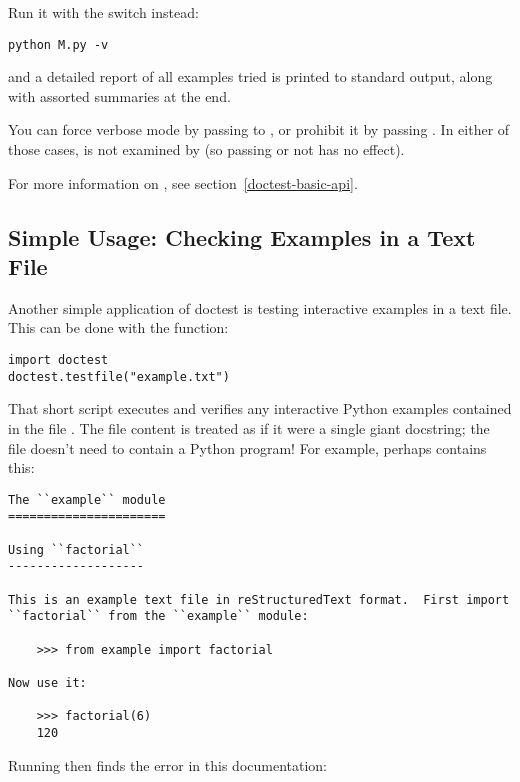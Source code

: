 Run it with the  switch instead:

\begin{verbatim}
python M.py -v
\end{verbatim}

and a detailed report of all examples tried is printed to standard
output, along with assorted summaries at the end.

You can force verbose mode by passing  to
, or
prohibit it by passing .  In either of those cases,
 is not examined by  (so passing
 or not has no effect).

For more information on , see
section~\ref{doctest-basic-api}.

\subsection{Simple Usage: Checking Examples in a Text
            File\label{doctest-simple-testfile}}

Another simple application of doctest is testing interactive examples
in a text file.  This can be done with the 
function:

\begin{verbatim}
import doctest
doctest.testfile("example.txt")
\end{verbatim}

That short script executes and verifies any interactive Python
examples contained in the file .  The file content
is treated as if it were a single giant docstring; the file doesn't
need to contain a Python program!   For example, perhaps 
contains this:

\begin{verbatim}
The ``example`` module
======================

Using ``factorial``
-------------------

This is an example text file in reStructuredText format.  First import
``factorial`` from the ``example`` module:

    >>> from example import factorial

Now use it:

    >>> factorial(6)
    120
\end{verbatim}

Running  then finds the error
in this documentation:

